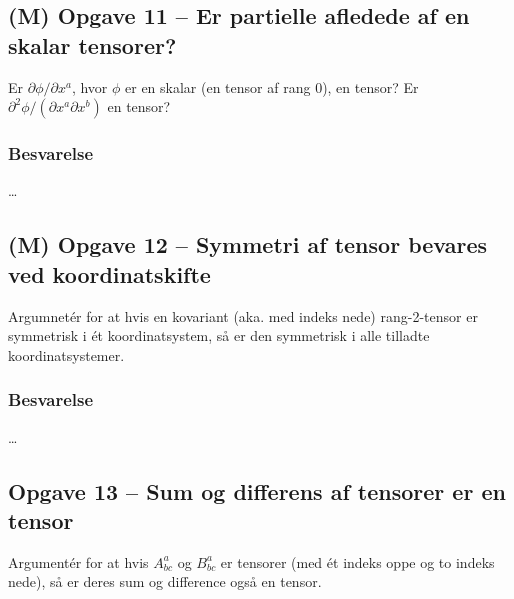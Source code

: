 \documentclass[../main.tex]{subfiles}
\begin{document}

\subsection{(M) Opgave 11 -- Er partielle afledede af en skalar tensorer?}
\setcounter{subsection}{11}
\setcounter{equation}{0}

Er $\partial \phi / \partial x^a$, hvor $\phi$ er en skalar (en tensor af rang $0$), en tensor? Er $\partial^2 \phi / (\partial x^a \partial x^b)$ en tensor?


\subsubsection{Besvarelse}

\ldots




\subsection{(M) Opgave 12 -- Symmetri af tensor bevares ved koordinatskifte}
\setcounter{subsection}{12}
\setcounter{equation}{0}

Argumnetér for at hvis en kovariant (aka. med indeks nede) rang-2-tensor er symmetrisk i ét koordinatsystem, så er den symmetrisk i alle tilladte koordinatsystemer.


\subsubsection{Besvarelse}

\ldots




\subsection{Opgave 13 -- Sum og differens af tensorer er en tensor}
\setcounter{subsection}{13}
\setcounter{equation}{0}

Argumentér for at hvis $A^a_{bc}$ og $B^a_{bc}$ er tensorer (med ét indeks oppe og to indeks nede), så er deres sum og difference også en tensor.
\end{document}
